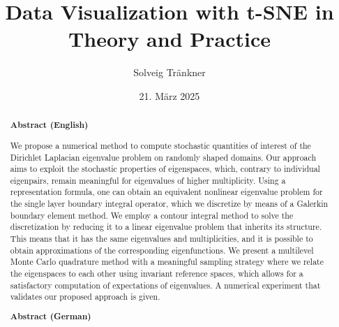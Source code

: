 \documentclass[paper=a4, fontsize=11pt, BCOR=13mm, DIV=13, headinclude, toc=index, toc=bibliography, english, twoside, parskip]{scrreprt}
\author{Solveig Tr\"ankner}
\date{21. M\"arz 2025}
\title{Data Visualization with t-SNE in Theory and Practice}
\theoremstyle{definition}               %
\theoremstyle{plain}
\begin{document}
\maketitle              %

\begin{abstract}
    \textbf{Abstract (English)}

    We propose a numerical method to compute stochastic quantities of interest of the Dirichlet Laplacian eigenvalue problem on randomly shaped domains.
    Our approach aims to exploit the stochastic properties of eigenspaces, which, contrary to individual eigenpairs, remain meaningful for eigenvalues of higher multiplicity.
    Using a representation formula, one can obtain an equivalent nonlinear eigenvalue problem for the single layer boundary integral operator, which we discretize by means of a Galerkin boundary element method.
    We employ a contour integral method to solve the discretization by reducing it to a linear eigenvalue problem that inherits its structure. This means that it has the same eigenvalues and multiplicities, and it is possible to obtain approximations of the corresponding eigenfunctions.
    We present a multilevel Monte Carlo quadrature method with a meaningful sampling strategy where we relate the eigenspaces to each other using invariant reference spaces, which allows for a satisfactory computation of expectations of eigenvalues.
    A numerical experiment that validates our proposed approach is given.


    \vspace{2em}
    \textbf{Abstract (German)}


\end{abstract}
\end{document}
